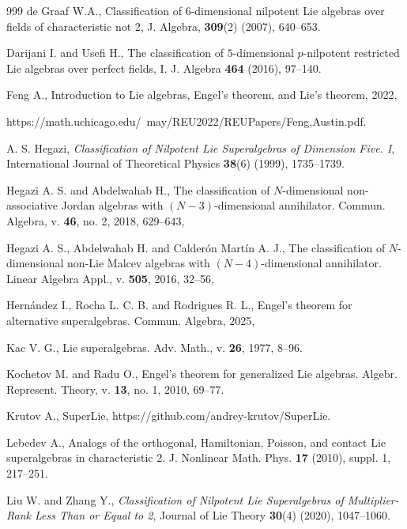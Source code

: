 \documentclass[12pt]{amsart}
\def\url#1{\expandafter\s

\tring\csname #1\endcsname}
\begin{document}
{\begin{thebibliography}{999}
 de Graaf W.A., Classification of 6-dimensional nilpotent Lie algebras over fields of characteristic not 2, J. Algebra, {\bf 309}(2) (2007), 640--653.

 Darijani I. and Usefi H., The classification of $5$-dimensional $p$-nilpotent restricted Lie algebras over perfect fields, I. J. Algebra \textbf{464} (2016), 97–140.

 Feng A., Introduction to Lie algebras, Engel's theorem, and Lie's theorem, 2022, \url{https://math.uchicago.edu/~may/REU2022/REUPapers/Feng,Austin.pdf}.

A. S. Hegazi, 
\emph{Classification of Nilpotent Lie Superalgebras of Dimension Five. {I}}, 
International Journal of Theoretical Physics \textbf{38}(6) (1999), 1735--1739. 

 Hegazi A. S. and Abdelwahab H., The classification of $N$-dimensional non-associative Jordan algebras with $(N-3)$-dimensional annihilator. Commun. Algebra, v. \textbf{46}, no. 2, 2018, 629–643, %

 Hegazi A. S., Abdelwahab H. and Calderón Martín A. J., The classification of $N$-dimensional non-Lie Malcev algebras with $(N-4)$-dimensional annihilator. Linear Algebra Appl., v. \textbf{505}, 2016, 32–56, %

 Hernández I., Rocha L. C. B. and Rodrigues R. L., Engel’s theorem for alternative superalgebras. Commun. Algebra, 2025, %

 Kac V. G., Lie superalgebras. Adv. Math., v. \textbf{26}, 1977, 8–96.

 Kochetov M. and Radu O., Engel’s theorem for generalized Lie algebras. Algebr. Represent. Theory, v. \textbf{13}, no. 1, 2010, 69–77.

 Krutov A., SuperLie, https://github.com/andrey-krutov/SuperLie.


  Lebedev A., Analogs of the orthogonal, Hamiltonian, Poisson, and contact Lie superalgebras in
characteristic 2. J. Nonlinear Math. Phys. \textbf{17} (2010), suppl. 1, 217–251.

Liu W. and Zhang Y., 
\emph{Classification of Nilpotent Lie Superalgebras of Multiplier-Rank Less Than or Equal to 2}, 
Journal of Lie Theory \textbf{30}(4) (2020), 1047--1060.


\end{thebibliography}}
\end{document}
